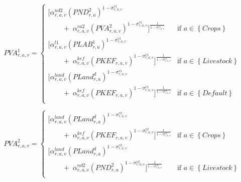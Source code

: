 \documentclass[11pt,letterpaper]{report}
\begin{document}
\begin{equation}
\label{eq:pva1}
\mathit{PVA}^1_{r,a,v} =
   \begin{cases}
      \biggl[ \alpha^{\mathit{nd2}}_{\mathit{r,a,v}}
         \left( \mathit{PND}^2_{\mathit{r,a}}
         \right)^{1 - \sigma^{\mathit{v1}}_{\mathit{r,a,v}}} \\
         \qquad + \; \alpha^{\mathit{va2}}_{\mathit{r,a,v}}
         \left( \mathit{PVA}^2_{\mathit{r,a,v}}
         \right)^{1 - \sigma^{\mathit{v1}}_{\mathit{r,a,v}}}
      \biggr]^{\frac{1}{1 - \sigma^{\mathit{v1}}_{\mathit{r,a,v}}}}
      & \textrm{if } a \in \left\{ \mathit{Crops} \right\} \\
      \biggl[ \alpha^{\mathit{l1}}_{\mathit{r,a,v}}
         \left( \mathit{PLAB}^1_{\mathit{r,a}}
         \right)^{1 - \sigma^{\mathit{v1}}_{\mathit{r,a,v}}} \\
         \qquad + \; \alpha^{\mathit{kef}}_{\mathit{r,a,v}}
         \left( \mathit{PKEF}_{\mathit{r,a,v}}
         \right)^{1 - \sigma^{\mathit{v1}}_{\mathit{r,a,v}}}
      \biggr]^{\frac{1}{1 - \sigma^{\mathit{v1}}_{\mathit{r,a,v}}}}
      & \textrm{if } a \in \left\{ \mathit{Livestock} \right\} \\
      \biggl[ \alpha^{\mathit{land}}_{\mathit{r,a,v}}
         \left( {\mathit{PLand}^d_{r,a}}
         \right)^{1 - \sigma^{\mathit{v1}}_{\mathit{r,a,v}}} \\
         \qquad + \; \alpha^{\mathit{kef}}_{\mathit{r,a,v}}
         \left( \mathit{PKEF}_{\mathit{r,a,v}}
         \right)^{1 - \sigma^{\mathit{v1}}_{\mathit{r,a,v}}}
      \biggr]^{\frac{1}{1 - \sigma^{\mathit{v1}}_{\mathit{r,a,v}}}}
      & \textrm{if } a \in \left\{ \mathit{Default} \right\} \\
\end{cases}
\end{equation}

\begin{equation}
\label{eq:pva2}
\mathit{PVA^2_{r,a,v}} =
   \begin{cases}
      \biggl[ \alpha^{\mathit{land}}_{\mathit{r,a,v}}
      \left( {\mathit{PLand}^d_{r,a}}
      \right)^{1 - \sigma^{\mathit{v2}}_{\mathit{r,a,v}}} \\
      \qquad + \; \alpha^{\mathit{kef}}_{\mathit{r,a,v}}
      \left( \mathit{PKEF}_{\mathit{r,a,v}}
      \right)^{1 - \sigma^{\mathit{v2}}_{\mathit{r,a,v}}}
   \biggr]^{\frac{1}{1 - \sigma^{\mathit{v2}}_{\mathit{r,a,v}}}}
   & \textrm{if } a \in \left\{ \mathit{Crops} \right\} \\
   \biggl[ \alpha^{\mathit{land}}_{\mathit{r,a,v}}
      \left({\mathit{PLand}^d_{r,a}}
      \right)^{1 - \sigma^{\mathit{v2}}_{\mathit{r,a,v}}} \\
   \qquad + \; \alpha^{\mathit{nd2}}_{\mathit{r,a,v}}
   \left( \mathit{PND}^2_{\mathit{r,a}}
   \right)^{1 - \sigma^{\mathit{v2}}_{\mathit{r,a,v}}}
   \biggr]^{\frac{1}{1 - \sigma^{\mathit{v2}}_{\mathit{r,a,v}}}}
   & \textrm{if } a \in \left\{ \mathit{Livestock} \right\} \\
\end{cases}
\end{equation}
\end{document}

